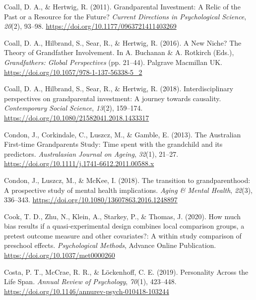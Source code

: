 \documentclass[
  english,
  man, noextraspace,floatsintext]{apa7}
\begin{document}
\leavevmode\hypertarget{ref-coallGrandparentalInvestmentRelic2011}{}%
Coall, D. A., \& Hertwig, R. (2011). Grandparental Investment: A Relic of the Past or a Resource for the Future? \emph{Current Directions in Psychological Science}, \emph{20}(2), 93--98. \url{https://doi.org/10.1177/0963721411403269}

\leavevmode\hypertarget{ref-coallNewNicheTheory2016}{}%
Coall, D. A., Hilbrand, S., Sear, R., \& Hertwig, R. (2016). A New Niche? The Theory of Grandfather Involvement. In A. Buchanan \& A. Rotkirch (Eds.), \emph{Grandfathers: Global Perspectives} (pp. 21--44). Palgrave Macmillan UK. \url{https://doi.org/10.1057/978-1-137-56338-5_2}

\leavevmode\hypertarget{ref-coallInterdisciplinaryPerspectivesGrandparental2018}{}%
Coall, D. A., Hilbrand, S., Sear, R., \& Hertwig, R. (2018). Interdisciplinary perspectives on grandparental investment: A journey towards causality. \emph{Contemporary Social Science}, \emph{13}(2), 159--174. \url{https://doi.org/10.1080/21582041.2018.1433317}

\leavevmode\hypertarget{ref-condonAustralianFirsttimeGrandparents2013}{}%
Condon, J., Corkindale, C., Luszcz, M., \& Gamble, E. (2013). The Australian First-time Grandparents Study: Time spent with the grandchild and its predictors. \emph{Australasian Journal on Ageing}, \emph{32}(1), 21--27. \url{https://doi.org/10.1111/j.1741-6612.2011.00588.x}

\leavevmode\hypertarget{ref-condonTransitionGrandparenthoodProspective2018}{}%
Condon, J., Luszcz, M., \& McKee, I. (2018). The transition to grandparenthood: A prospective study of mental health implications. \emph{Aging \& Mental Health}, \emph{22}(3), 336--343. \url{https://doi.org/10.1080/13607863.2016.1248897}

\leavevmode\hypertarget{ref-cookHowMuchBias2020}{}%
Cook, T. D., Zhu, N., Klein, A., Starkey, P., \& Thomas, J. (2020). How much bias results if a quasi-experimental design combines local comparison groups, a pretest outcome measure and other covariates?: A within study comparison of preschool effects. \emph{Psychological Methods}, Advance Online Publication. \url{https://doi.org/10.1037/met0000260}

\leavevmode\hypertarget{ref-costaPersonalityLifeSpan2019}{}%
Costa, P. T., McCrae, R. R., \& Löckenhoff, C. E. (2019). Personality Across the Life Span. \emph{Annual Review of Psychology}, \emph{70}(1), 423--448. \url{https://doi.org/10.1146/annurev-psych-010418-103244}
\end{document}
